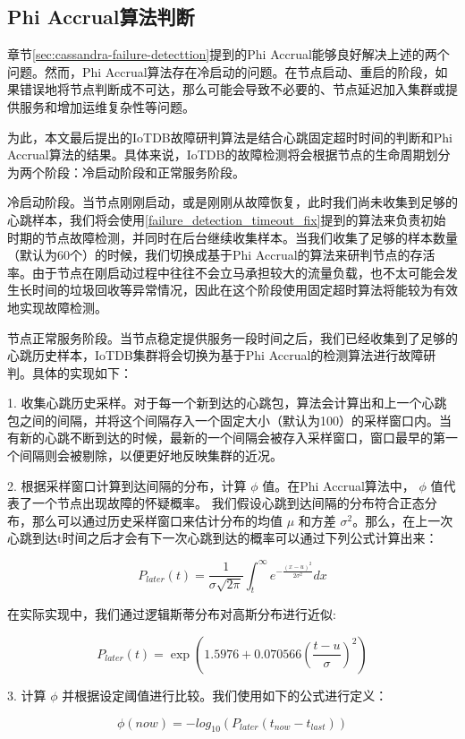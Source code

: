 \subsection{Phi Accrual算法判断}

章节\ref{sec:cassandra-failure-detecttion}提到的Phi Accrual能够良好解决上述的两个问题。然而，Phi Accrual算法存在冷启动的问题。在节点启动、重启的阶段，如果错误地将节点判断成不可达，那么可能会导致不必要的\failover 、节点延迟加入集群或提供服务和增加运维复杂性等问题。

为此，本文最后提出的IoTDB故障研判算法是结合心跳固定超时时间的判断和Phi Accrual算法的结果。具体来说，IoTDB的故障检测将会根据节点的生命周期划分为两个阶段：冷启动阶段和正常服务阶段。

冷启动阶段。当节点刚刚启动，或是刚刚从故障恢复，此时我们尚未收集到足够的心跳样本，我们将会使用\ref{failure_detection_timeout_fix}提到的算法来负责初始时期的节点故障检测，并同时在后台继续收集样本。当我们收集了足够的样本数量（默认为60个）的时候，我们切换成基于Phi Accrual的算法来研判节点的存活率。由于节点在刚启动过程中往往不会立马承担较大的流量负载，也不太可能会发生长时间的垃圾回收等异常情况，因此在这个阶段使用固定超时算法将能较为有效地实现故障检测。

节点正常服务阶段。当节点稳定提供服务一段时间之后，我们已经收集到了足够的心跳历史样本，IoTDB集群将会切换为基于Phi Accrual的检测算法进行故障研判。具体的实现如下：

1. 收集心跳历史采样。对于每一个新到达的心跳包，算法会计算出和上一个心跳包之间的间隔，并将这个间隔存入一个固定大小（默认为100）的采样窗口内。当有新的心跳不断到达的时候，最新的一个间隔会被存入采样窗口，窗口最早的第一个间隔则会被剔除，以便更好地反映集群的近况。

2. 根据采样窗口计算到达间隔的分布，计算 $\phi$ 值。在Phi Accrual算法中， $\phi$ 值代表了一个节点出现故障的怀疑概率。
我们假设心跳到达间隔的分布符合正态分布，那么可以通过历史采样窗口来估计分布的均值 $\mu$ 和方差 $\sigma^2$。那么，在上一次心跳到达t时间之后才会有下一次心跳到达的概率可以通过下列公式计算出来：

$$ P_{later}(t) = \frac{1}{\sigma\sqrt{2\pi}} \int_{t}^{\infty} e^{-\frac{(x-u)^2}{2\sigma^2}} dx $$

在实际实现中，我们通过逻辑斯蒂分布对高斯分布进行近似\cite{bronvstejn2013handbook}:

$$ P_{later}(t) = \exp(1.5976 + 0.070566 (\frac{t-u}{\sigma})^2) $$

3. 计算 $\phi$ 并根据设定阈值进行比较。我们使用如下的公式进行定义：

$$ \phi(now) = -log_{10}(P_{later}(t_{now} - t_{last})) $$

